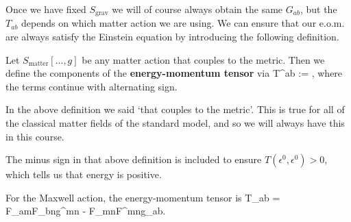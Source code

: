 Once we have fixed $S_{\text{grav}}$ we will of course always obtain the same $G_{ab}$, but the $T_{ab}$ depends on which matter action we are using. We can ensure that our e.o.m. are always satisfy the Einstein equation by introducing the following definition. 

    Let $S_{\text{matter}}[...,g]$ be any matter action that couples to the metric. Then we define the components of the \textbf{energy-momentum tensor} via 
    \bse 
        T^{ab} := ,
    \ese
    where the terms continue with alternating sign. 
\ed 

\br 
    In the above definition we said `that couples to the metric'. This is true for all of the classical matter fields of the standard model, and so we will always have this in this course. 
\er 

\br 
    The minus sign in that above definition is included to ensure $T(\epsilon^0,\epsilon^0)>0$, which tells us that energy is positive. 
\er 

\bex 
    For the Maxwell action, the energy-momentum tensor is 
    \bse 
        T_{ab} = F_{am}F_{bn}g^{mn} -  F_{mn}F^{mn}g_{ab}.
    \ese
\eex 